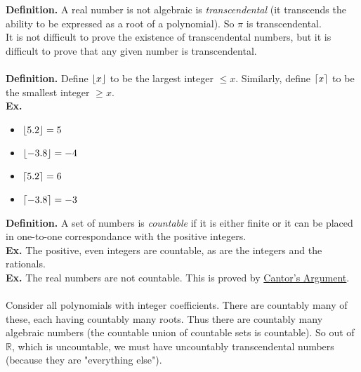 \documentclass[class=article, crop=false]{standalone}
\DeclarePairedDelimiter\ceil{\lceil}{\rceil}
\DeclarePairedDelimiter\floor{\lfloor}{\rfloor}
\begin{document}
\textbf{Definition.} A real number is not algebraic is \emph{transcendental} (it transcends the ability to be expressed as a root of a polynomial).
So $\pi$ is transcendental.\\
It is not difficult to prove the existence of transcendental numbers, but it is difficult to prove that any given number is transcendental.\\\\
\textbf{Definition.} Define $\floor{x}$ to be the largest integer $\leq x$. Similarly, define $\ceil{x}$ to be the smallest integer $\geq x$.\\
\textbf{Ex.}
	\begin{itemize}
		\item $\floor{5.2} = 5$
		\item $\floor{-3.8} = -4$
		\item $\ceil{5.2} = 6$
		\item $\ceil{-3.8} = -3$
	\end{itemize}
\textbf{Definition.} A set of numbers is \emph{countable} if it is either finite or it can be placed in one-to-one correspondance
with the positive integers.\\
\textbf{Ex.} The positive, even integers are countable, as are the integers and the rationals.\\
\textbf{Ex.} The real numbers are not countable. This is proved by \href{https://jlmartin.ku.edu/~jlmartin/courses/math410-S13/cantor.pdf}{Cantor's Argument}.\\\\
Consider all polynomials with integer coefficients. There are countably many of these, each having countably many roots.
Thus there are countably many algebraic numbers (the countable union of countable sets is countable). So out of $\mathbb{R}$,
which is uncountable, we must have uncountably transcendental numbers (because they are "everything else").
\end{document}
